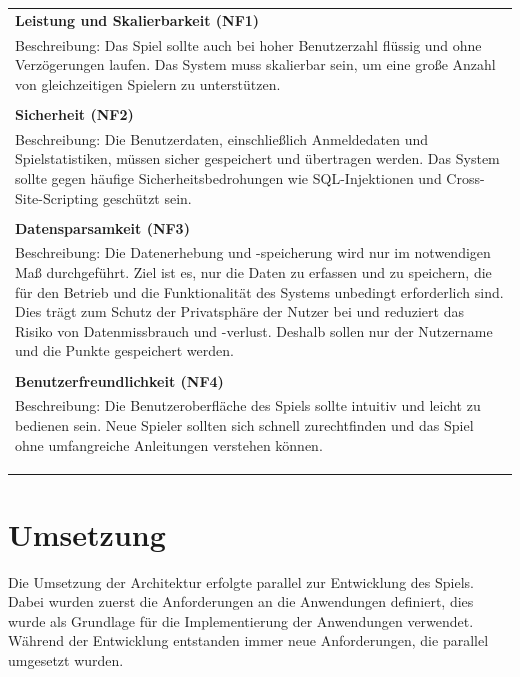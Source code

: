 \documentclass[
]{article}
\begin{document}
\begin{center}
  \begin{tabular}{|p{\linewidth}|}
    \hline
    \textbf{Leistung und Skalierbarkeit (NF1)} \\
    Beschreibung: Das Spiel sollte auch bei hoher Benutzerzahl flüssig und ohne Verzögerungen laufen. Das System muss skalierbar sein, um eine große Anzahl von gleichzeitigen Spielern zu unterstützen. \\ \\
    \hline
    \textbf{Sicherheit (NF2)} \\
    Beschreibung: Die Benutzerdaten, einschließlich Anmeldedaten und Spielstatistiken, müssen sicher gespeichert und übertragen werden. Das System sollte gegen häufige Sicherheitsbedrohungen wie SQL-Injektionen und Cross-Site-Scripting geschützt sein.\\ \\
    \hline
    \textbf{Datensparsamkeit (NF3)} \\
     Beschreibung:
     Die Datenerhebung und -speicherung wird nur im notwendigen Maß durchgeführt. 
     Ziel ist es, nur die Daten zu erfassen und zu speichern, die für den Betrieb und die Funktionalität des Systems unbedingt erforderlich sind. 
     Dies trägt zum Schutz der Privatsphäre der Nutzer bei und reduziert das Risiko von Datenmissbrauch und -verlust.
     Deshalb sollen nur der Nutzername und die Punkte gespeichert werden.
    \\ \\
    \hline
    \textbf{Benutzerfreundlichkeit (NF4)} \\
    Beschreibung: Die Benutzeroberfläche des Spiels sollte intuitiv und leicht zu bedienen sein. Neue Spieler sollten sich schnell zurechtfinden und das Spiel ohne umfangreiche Anleitungen verstehen können.\\ \\
    \\ \\
    \hline
  \end{tabular}
\end{center}

\newpage
\section{Umsetzung}
Die Umsetzung der Architektur erfolgte parallel zur Entwicklung des Spiels.
Dabei wurden zuerst die Anforderungen an die Anwendungen definiert, dies wurde als Grundlage
für die Implementierung der Anwendungen verwendet. Während der Entwicklung entstanden immer
neue Anforderungen, die parallel umgesetzt wurden.
\end{document}
